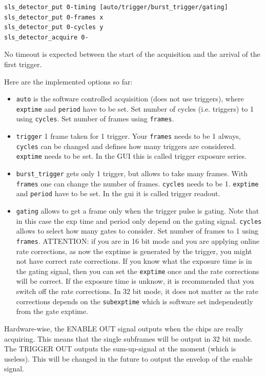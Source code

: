 \documentclass{article}
\begin{document}
\begin{verbatim}
sls_detector_put 0-timing [auto/trigger/burst_trigger/gating]
sls_detector_put 0-frames x
sls_detector_put 0-cycles y
sls_detector_acquire 0-
\end{verbatim}
No timeout is expected between the start of the acquisition and the arrival of the first trigger. 

Here are the implemented options so far:
\begin{itemize}
\item {\tt{auto}} is the software controlled acquisition (does not use triggers), where {\tt{exptime}} and {\tt{period}} have to be set. Set number of cycles (i.e. triggers) to 1 using {\tt{cycles}}. Set number of frames using {\tt{frames}}.
\item {\tt{trigger}} 1 frame taken for 1 trigger. Your {\tt{frames}} needs to be  1 always, {\tt{cycles}} can be changed and defines how many triggers are considered.  {\tt{exptime}} needs to be set. In the GUI this is called trigger exposure series.  
\item {\tt{burst\_trigger}} gets only 1 trigger, but allows to take many frames. With {\tt{frames}} one can change the number of frames. {\tt{cycles}} needs to be 1.  {\tt{exptime}} and {\tt{period}} have to be set. In the gui it is called trigger readout.
\item{\tt{gating}} allows to get a frame only when the trigger pulse is gating. Note that in this case the exp time and period only depend on the gating signal. {\tt{cycles}} allows to select how many gates to consider.  Set number of frames to 1 using {\tt{frames}}. ATTENTION: if you are in 16 bit mode and you are applying online rate corrections, as now the exptime is generated by the trigger, you might not have correct rate corrections. If you know what the exposure time is in the gating signal, then you can set the {\tt{exptime}} once and the rate corrections will be correct. If the exposure time is unknow, it is recommended that you switch off the rate corrections. In 32 bit mode, it does not matter as the rate corrections depends on the {\tt{subexptime}} which is software set independently from the gate exptime.

\end{itemize}

Hardware-wise, the ENABLE OUT signal outputs when the chips are really acquiring. This means that the single subframes will be output in 32 bit mode. The TRIGGER OUT outputs the sum-up-signal at the moment (which is useless). This will be changed in the future to output the envelop of the enable signal. 
\end{document}
